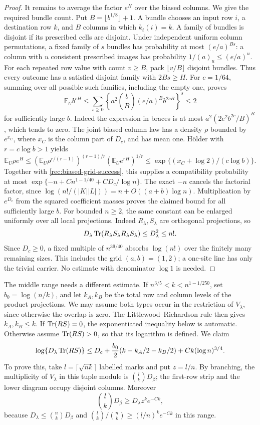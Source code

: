 \begin{proof}
It remains to average the factor $e^H$ over the biased columns.
We give the required bundle count. Put $B=\lfloor b^{1/8}\rfloor+1$.
A bundle chooses an input row $i$, a destination row $k$, and $B$
columns in which $k_t(i)=k$. A family of bundles is disjoint if
its prescribed cells are disjoint. Under independent uniform
column permutations, a fixed family of $s$ bundles has probability
at most $(e/a)^{Bs}$: a column with $u$ consistent prescribed
images has probability $1/(a)_u\le(e/a)^u$.
For each repeated row value with count $v\ge B$, pack
$\lfloor v/B\rfloor$ disjoint bundles. Thus every outcome has a
satisfied disjoint family with $2Bs\ge H$.
For $c=1/64$, summing over all possible such families, including
the empty one, proves
\[
 \mathbb E_U b^{cH}
 \le\sum_{s\ge0}
 \left\{a^2\binom bB(e/a)^B b^{2cB}\right\}^{s}
 \le2
\]
for sufficiently large $b$. Indeed the expression in braces is
at most $a^2(2e^2b^{2c}/B)^B$, which tends to zero.
The joint biased column law has a density $\rho$ bounded by
$e^{x_C}$, where $x_C$ is the column part of $D_c$, and has mean
one. H\"older with $r=c\log b>1$ yields
\[
 \mathbb E_U\rho e^H
 \le(\mathbb E_U\rho^{r/(r-1)})^{(r-1)/r}
       (\mathbb E_U e^{rH})^{1/r}
 \le\exp\{(x_C+\log2)/(c\log b)\}.
\]
Together with \eqref{rec:biased-grid-success}, this supplies a
compatibility probability at most
$\exp\{-n+Cn^{1-1/40}+CD_c/\log n\}$.
The exact $-n$ cancels the factorial factor, since
$\log(n!/(|K||L|))=n+O((a+b)\log n)$.
Multiplication by $e^{D_c}$ from the squared coefficient masses
proves the claimed bound for all sufficiently large $b$.
For bounded $n\ge2$, the same constant can be enlarged uniformly
over all local projections. Indeed $R_\lambda,S_\lambda$ are
orthogonal projections, so
\[
 D_\lambda\operatorname{Tr}(R_\lambda S_\lambda R_\lambda S_\lambda)
 \le D_\lambda^2\le n!.
\]
Since $D_c\ge0$, a fixed multiple of $n^{39/40}$ absorbs
$\log(n!)$ over the finitely many remaining sizes. This includes
the grid $(a,b)=(1,2)$; a one-site line has only the trivial
carrier. No estimate with denominator $\log1$ is needed.
\end{proof}

The middle range needs a different estimate.  If
$n^{3/5}<k<n^{1-1/250}$, set $b_0=\log(n/k)$, and let $k_A,k_B$ be
the total row and column levels of the product projections. We may
assume both types occur in the restriction of $V_\lambda$, since
otherwise the overlap is zero. The Littlewood--Richardson rule then
gives $k_A,k_B\le k$. If $\operatorname{Tr}(RS)=0$, the exponentiated inequality
below is automatic. Otherwise assume $\operatorname{Tr}(RS)>0$, so that its
logarithm is defined. We claim
\begin{equation}\label{rec:tuple-grid-second}
 \log\{D_\lambda\operatorname{Tr}(RS)\}
 \le D_c+\frac{b_0}{2}(k-k_A/2-k_B/2)
                  +Ck(\log n)^{3/4}.
\end{equation}
To prove this, take $l=\lceil\sqrt{nk}\rceil$ labelled marks and put
$z=l/n$. By branching, the multiplicity of $V_\lambda$ in this
tuple module is $\binom lkD_\beta$; the first-row strip and the lower
diagram occupy disjoint columns. Moreover
\[
 \binom lkD_\beta\ge D_\lambda z^k e^{-Ck},
\]
because $D_\lambda\le\binom nkD_\beta$ and
$\binom lk/\binom nk\ge(l/n)^k e^{-Ck}$ in this range.

